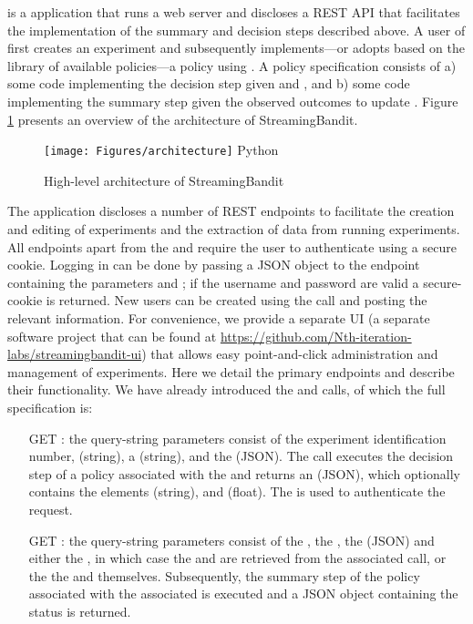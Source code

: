 \documentclass[nojss]{jss}
\begin{document}
 is a  application that runs a  web server \citep{tornado} and discloses a REST API that facilitates the implementation of the summary and decision steps described above. A user of  first creates an experiment and subsequently implements---or adopts based on the library of available policies---a policy using . A policy specification consists of a) some code implementing the decision step given  and , and b) some code implementing the summary step given the observed outcomes to update . Figure \ref{fig:architect} presents an overview of the architecture of StreamingBandit. 

\begin{figure}[htp]
  \centering
    \texttt{[image: Figures/architecture]}
    \label{fig:1}Python
      \caption{High-level architecture of StreamingBandit}
      \label{fig:architect}
\end{figure}

The application discloses a number of REST endpoints to facilitate the creation and editing of experiments and the extraction of data from running experiments. All endpoints apart from the  and  require the user to authenticate using a secure cookie. Logging in can be done by passing a JSON object to the  endpoint containing the parameters  and ; if the username and password are valid a secure- cookie is returned. New users can be created using the  call and posting the relevant information. For convenience, we provide a separate UI (a separate software project that can be found at \url{https://github.com/Nth-iteration-labs/streamingbandit-ui}) that allows easy point-and-click administration and management of experiments. Here we detail the primary endpoints and describe their functionality. We have already introduced the  and  calls, of which the full specification is:

\begin{itemize}
\item [GET] : the query-string parameters consist of the experiment identification number,  (string), a  (string), and the  (JSON). The call executes the decision step of a policy associated with the  and returns an  (JSON), which optionally contains the elements  (string), and  (float). The  is used to authenticate the request.
\item [GET] : the query-string parameters consist of the , the , the  (JSON) and either the , in which case the  and  are retrieved from the associated  call, or the the  and  themselves. Subsequently, the summary step of the policy associated with the associated  is executed and a JSON object containing the status is returned.
\end{itemize}
\end{document}
